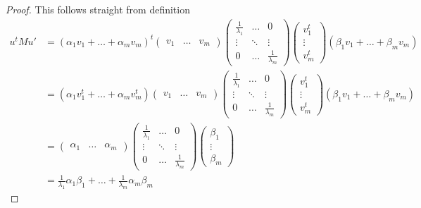 \documentclass[11pt]{amsart}
\theoremstyle{definition}
\begin{document}
\begin{proof} This follows straight from definition
\begin{align*}
u^t M u' & = (\alpha_1 v_1 + \dots + \alpha_m v_m)^t \left( \begin{array}{ccc} v_1 & \dots & v_m \end{array} \right)
\left( \begin{array}{ccc} \frac{1}{\lambda_1} & \dots & 0 \\ \vdots & \ddots & \vdots \\ 0 & \dots & \frac{1}{\lambda_m} \end{array} \right)
\left( \begin{array}{c} v_1^t \\ \vdots \\ v_m^t \end{array} \right) (\beta_1 v_1 + \dots + \beta_m v_m) \\
 & = (\alpha_1 v_1^t + \dots + \alpha_m v_m^t) \left( \begin{array}{ccc} v_1 & \dots & v_m \end{array} \right)
\left( \begin{array}{ccc} \frac{1}{\lambda_1} & \dots & 0 \\ \vdots & \ddots & \vdots \\ 0 & \dots & \frac{1}{\lambda_m} \end{array} \right)
\left( \begin{array}{c} v_1^t \\ \vdots \\ v_m^t \end{array} \right) (\beta_1 v_1 + \dots + \beta_m v_m) \\
 & = \left( \begin{array}{ccc} \alpha_1 & \dots & \alpha_m \end{array} \right) \left( \begin{array}{ccc} \frac{1}{\lambda_1} & \dots & 0 \\ \vdots & \ddots & \vdots \\ 0 & \dots & \frac{1}{\lambda_m} \end{array} \right) \left( \begin{array}{c} \beta_1 \\ \vdots \\ \beta_m \end{array} \right) \\
 & = \frac{1}{\lambda_1} \alpha_1 \beta_1 + \dots + \frac{1}{\lambda_m} \alpha_m \beta_m
\end{align*}
\end{proof}
\end{document}
